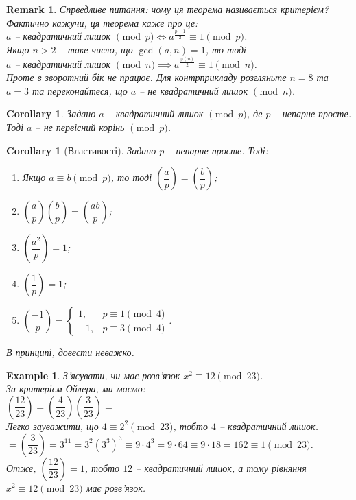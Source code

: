 \documentclass[a4paper, 14pt]{extarticle}
\theoremstyle{theoremdd}
\theoremstyle{theoremdd}
\theoremstyle{theoremdd}
\theoremstyle{theoremdd}
\newtheorem{example}[theorem]{Example}
\theoremstyle{theoremdd}
\theoremstyle{theoremdd}
\newtheorem{remark}[theorem]{Remark}
\theoremstyle{theoremdd}
\theoremstyle{theoremdd}
\newtheorem{corollary}[theorem]{Corollary}
\begin{document}
\begin{remark}
Спрведливе питання: чому ця теорема називається критерієм? Фактично кажучи, ця теорема каже про це:\\
$a$ -- квадратичний лишок $\pmod p \iff a^{\frac{p-1}{2}} \equiv 1 \pmod p$.\\
Якщо $n > 2$ -- таке число, що $\gcd(a,n) = 1$, то тоді\\
$a$ -- квадратичний лишок $\pmod n \implies a^{\frac{\varphi(n)}{2}} \equiv 1 \pmod n$.\\
Проте в зворотний бік не працює. Для контрприкладу розгляньте $n = 8$ та $a = 3$ та переконайтеся, що $a$ -- не квадратичний лишок $\pmod n$.
\end{remark}

\begin{corollary}
Задано $a$ -- квадратичний лишок $\pmod p$, де $p$ -- непарне просте. Тоді $a$ -- не первісний корінь $\pmod p$.
\end{corollary}

\begin{corollary}[Властивості]
Задано $p$ -- непарне просте. Тоді:
\begin{enumerate}[nosep,wide=0pt,label={\arabic*)}]
\item Якщо $a \equiv b \pmod p$, то тоді $\left( \dfrac{a}{p} \right) = \left( \dfrac{b}{p} \right)$;
\item $\left( \dfrac{a}{p} \right) \left( \dfrac{b}{p} \right) = \left( \dfrac{ab}{p} \right)$;
\item $\left( \dfrac{a^2}{p} \right) = 1$;
\item $\left( \dfrac{1}{p} \right) = 1$;
\item $\left( \dfrac{-1}{p} \right) = \begin{cases} 1, & p \equiv 1 \pmod 4 \\ -1, & p \equiv 3 \pmod 4 \end{cases}$.
\end{enumerate}
\textit{В принципі, довести неважко.}
\end{corollary}

\begin{example}
З'ясувати, чи має розв'язок $x^2 \equiv 12 \pmod {23}$.\\
За критерієм Ойлера, ми маємо:\\
$\left( \dfrac{12}{23} \right) = \left( \dfrac{4}{23} \right) \left( \dfrac{3}{23} \right) \boxed{=}$\\
Легко зауважити, що $4 \equiv 2^2 \pmod {23}$, тобто $4$ -- квадратичний лишок.\\
$\boxed{=} \left( \dfrac{3}{23} \right) = 3^{11} = 3^2 (3^3)^3 \equiv 9 \cdot 4^3 = 9 \cdot 64 \equiv 9 \cdot 18 = 162 \equiv 1 \pmod {23}$.\\
Отже, $\left( \dfrac{12}{23} \right) = 1$, тобто $12$ -- квадратичний лишок, а тому рівняння $x^2 \equiv 12 \pmod {23}$ має розв'язок.
\end{example}
\end{document}
